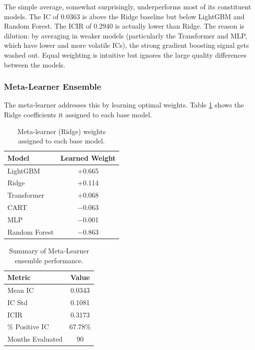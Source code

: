 \documentclass[11pt]{article}
\begin{document}
The simple average, somewhat surprisingly, underperforms most of its constituent models. The IC of 0.0363 is above the Ridge baseline but below LightGBM and Random Forest. The ICIR of 0.2940 is actually lower than Ridge. The reason is dilution: by averaging in weaker models (particularly the Transformer and MLP, which have lower and more volatile ICs), the strong gradient boosting signal gets washed out. Equal weighting is intuitive but ignores the large quality differences between the models.

\subsubsection{Meta-Learner Ensemble}

The meta-learner addresses this by learning optimal weights. Table \ref{tab:meta_weights} shows the Ridge coefficients it assigned to each base model.

\begin{table}[H]
\centering
\begin{tabular}{lc}
\toprule
\textbf{Model} & \textbf{Learned Weight} \\
\midrule
LightGBM      & +0.665 \\
Ridge         & +0.114 \\
Transformer   & +0.068 \\
CART          & $-$0.063 \\
MLP           & $-$0.001 \\
Random Forest & $-$0.863 \\
\bottomrule
\end{tabular}
\caption{Meta-learner (Ridge) weights assigned to each base model.}
\label{tab:meta_weights}
\end{table}

\begin{table}[H]
\centering
\begin{tabular}{lc}
\toprule
\textbf{Metric} & \textbf{Value} \\
\midrule
Mean IC & 0.0343 \\
IC Std & 0.1081 \\
ICIR & 0.3173 \\
\% Positive IC & 67.78\% \\
Months Evaluated & 90 \\
\bottomrule
\end{tabular}
\caption{Summary of Meta-Learner ensemble performance.}
\label{tab:meta_results}
\end{table}
\end{document}
